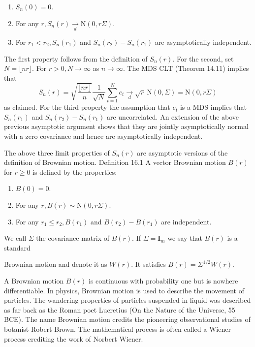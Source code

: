 \documentclass[10pt]{article}
\begin{document}
\begin{enumerate}
  \item $S_{n}(0)=0$.

  \item For any $r, S_{n}(r) \underset{d}{\longrightarrow} \mathrm{N}(0, r \Sigma)$.

  \item For $r_{1}<r_{2}, S_{n}\left(r_{1}\right)$ and $S_{n}\left(r_{2}\right)-S_{n}\left(r_{1}\right)$ are asymptotically independent.

\end{enumerate}
The first property follows from the definition of $S_{n}(r)$. For the second, set $N=\lfloor n r\rfloor$. For $r>0, N \rightarrow \infty$ as $n \rightarrow \infty$. The MDS CLT (Theorem 14.11) implies that
$$
S_{n}(r)=\sqrt{\frac{\lfloor n r\rfloor}{n}} \frac{1}{\sqrt{N}} \sum_{t=1}^{N} e_{t} \underset{d}{\longrightarrow} \sqrt{r} \mathrm{~N}(0, \Sigma)=\mathrm{N}(0, r \Sigma)
$$
as claimed. For the third property the assumption that $e_{t}$ is a MDS implies that $S_{n}\left(r_{1}\right)$ and $S_{n}\left(r_{2}\right)-S_{n}\left(r_{1}\right)$ are uncorrelated. An extension of the above previous asymptotic argument shows that they are jointly asymptotically normal with a zero covariance and hence are asymptotically independent.

The above three limit properties of $S_{n}(r)$ are asymptotic versions of the definition of Brownian motion. Definition 16.1 A vector Brownian motion $B(r)$ for $r \geq 0$ is defined by the properties:

\begin{enumerate}
  \item $B(0)=0$.

  \item For any $r, B(r) \sim \mathrm{N}(0, r \Sigma)$.

  \item For any $r_{1} \leq r_{2}, B\left(r_{1}\right)$ and $B\left(r_{2}\right)-B\left(r_{1}\right)$ are independent.

\end{enumerate}
We call $\Sigma$ the covariance matrix of $B(r)$. If $\Sigma=\boldsymbol{I}_{m}$ we say that $B(r)$ is a standard

Brownian motion and denote it as $W(r)$. It satisfies $B(r)=\Sigma^{1 / 2} W(r)$.

A Brownian motion $B(r)$ is continuous with probability one but is nowhere differentiable. In physics, Brownian motion is used to describe the movement of particles. The wandering properties of particles suspended in liquid was described as far back as the Roman poet Lucretius (On the Nature of the Universe, 55 BCE). The name Brownian motion credits the pioneering observational studies of botanist Robert Brown. The mathematical process is often called a Wiener process crediting the work of Norbert Wiener.
\end{document}

